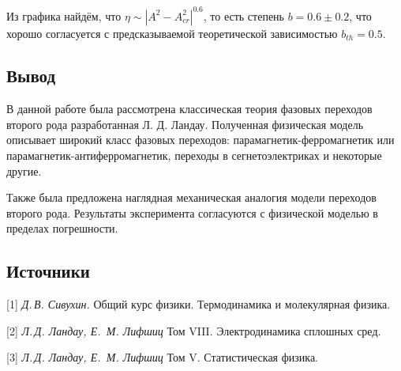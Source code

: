 \documentclass[a4paper, 12pt]{article}
\begin{document}
Из графика найдём, что $\eta \sim |A^2 - A_{cr}^2|^{0.6}$, то есть степень $b = 0.6 \pm 0.2$, что хорошо согласуется с предсказываемой теоретической зависимостью $b_{th} = 0.5$.


\subsection*{Вывод}
 
В данной работе была рассмотрена классическая теория фазовых переходов второго рода разработанная Л. Д. Ландау. Полученная физическая модель описывает широкий класс фазовых переходов:  парамагнетик-ферромагнетик или парамагнетик-антиферромагнетик, переходы в сегнетоэлектриках и некоторые другие.

Также была предложена наглядная механическая аналогия модели переходов второго рода. Результаты эксперимента согласуются с физической моделью в пределах погрешности.


\subsection*{Источники}

[1] \textit{Д.\,В. Сивухин.} Общий курс физики. Термодинамика и молекулярная физика.

\vspace{-.7\parskip}
[2] \textit{Л.\,Д. Ландау, Е.\, М. Лифшиц} Том VIII. Электродинамика сплошных сред.

\vspace{-.7\parskip}
[3] \textit{Л.\,Д. Ландау, Е.\, М. Лифшиц} Том V. Статистическая физика.
\end{document}
